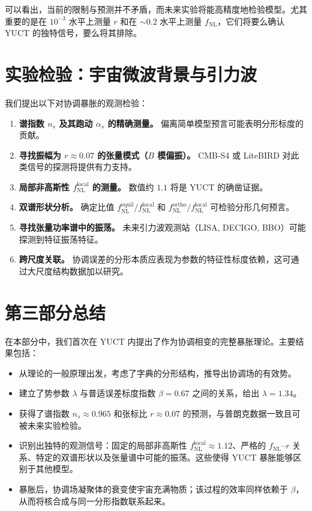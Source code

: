 \documentclass[11pt,a4paper]{article}
\begin{document}
	可以看出，当前的限制与预测并不矛盾，而未来实验将能高精度地检验模型。尤其重要的是在 \(10^{-3}\) 水平上测量 \(r\) 和在 \(\sim 0.2\) 水平上测量 \(f_{\text{NL}}\)，它们将要么确认 YUCT 的独特信号，要么将其排除。
	
	\section{实验检验：宇宙微波背景与引力波}
	\label{sec:tests}
	
	我们提出以下对协调暴胀的观测检验：
	
	\begin{enumerate}
		\item \textbf{谱指数 \(n_s\) 及其跑动 \(\alpha_s\) 的精确测量。} 偏离简单模型预言可能表明分形标度的贡献。
		\item \textbf{寻找振幅为 \(r \approx 0.07\) 的张量模式（\(B\) 模偏振）。} CMB‑S4 或 LiteBIRD 对此类信号的探测将提供有力支持。
		\item \textbf{局部非高斯性 \(f_{\text{NL}}^{\text{local}}\) 的测量。} 数值约 \(1.1\) 将是 YUCT 的确凿证据。
		\item \textbf{双谱形状分析。} 确定比值 \(f_{\text{NL}}^{\text{equil}}/f_{\text{NL}}^{\text{local}}\) 和 \(f_{\text{NL}}^{\text{ortho}}/f_{\text{NL}}^{\text{local}}\) 可检验分形几何预言。
		\item \textbf{寻找张量功率谱中的振荡。} 未来引力波观测站（LISA, DECIGO, BBO）可能探测到特征振荡特征。
		\item \textbf{跨尺度关联。} 协调误差的分形本质应表现为参数的特征性标度依赖，这可通过大尺度结构数据加以研究。
	\end{enumerate}
	
	\section{第三部分总结}
	\label{sec:conclusion-inflation}
	
	在本部分中，我们首次在 YUCT 内提出了作为协调相变的完整暴胀理论。主要结果包括：
	
	\begin{itemize}
		\item 从理论的一般原理出发，考虑了字典的分形结构，推导出协调场的有效势。
		\item 建立了势参数 \(\lambda\) 与普适误差标度指数 \(\beta = 0.67\) 之间的关系，给出 \(\lambda = 1.34\)。
		\item 获得了谱指数 \(n_s \approx 0.965\) 和张标比 \(r \approx 0.07\) 的预测，与普朗克数据一致且可被未来实验检验。
		\item 识别出独特的观测信号：固定的局部非高斯性 \(f_{\text{NL}}^{\text{local}} \approx 1.12\)、严格的 \(f_{\text{NL}}\)–\(r\) 关系、特定的双谱形状以及张量谱中可能的振荡。这些使得 YUCT 暴胀能够区别于其他模型。
		\item 暴胀后，协调场凝聚体的衰变使宇宙充满物质；该过程的效率同样依赖于 \(\beta\)，从而将核合成与同一分形指数联系起来。
	\end{itemize}
	
\end{document}
